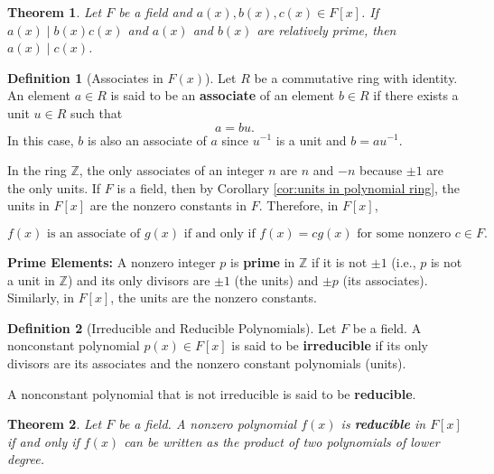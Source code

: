 \documentclass{article}
\newtheorem{theorem}{Theorem}[section]
\theoremstyle{definition}
\newtheorem{definition}{Definition}[section]
\theoremstyle{remark}
\begin{document}
\begin{theorem} \label{thm:relatively prime divisibility}
Let $F$ be a field and $a(x), b(x), c(x) \in F[x]$. If $a(x) \mid b(x)c(x)$ and $a(x)$ and $b(x)$ are relatively prime, then $a(x) \mid c(x)$.
\end{theorem}

\begin{definition}[Associates in $F(x)$]
Let $R$ be a commutative ring with identity. An element $a \in R$ is said to be an \textbf{associate} of an element $b \in R$ if there exists a unit $u \in R$ such that
\[
a = bu.
\]
In this case, $b$ is also an associate of $a$ since $u^{-1}$ is a unit and $b = au^{-1}$.

In the ring $\mathbb{Z}$, the only associates of an integer $n$ are $n$ and $-n$ because $\pm 1$ are the only units. If $F$ is a field, then by Corollary \ref{cor:units in polynomial ring}, the units in $F[x]$ are the nonzero constants in $F$. Therefore, in $F[x]$,

\[
f(x) \text{ is an associate of } g(x) \text{ if and only if } f(x) = c g(x) \text{ for some nonzero } c \in F.
\]

\textbf{Prime Elements:}  
A nonzero integer $p$ is \textbf{prime} in $\mathbb{Z}$ if it is not $\pm1$ (i.e., $p$ is not a unit in $\mathbb{Z}$) and its only divisors are $\pm1$ (the units) and $\pm p$ (its associates). Similarly, in $F[x]$, the units are the nonzero constants.

\end{definition}


\begin{definition}[Irreducible and Reducible Polynomials]
Let $F$ be a field. A nonconstant polynomial $p(x) \in F[x]$ is said to be \textbf{irreducible} if its only divisors are its associates and the nonzero constant polynomials (units). 

A nonconstant polynomial that is not irreducible is said to be \textbf{reducible}.
\end{definition}


\begin{theorem} \label{thm:reducibility criterion}
Let $F$ be a field. A nonzero polynomial $f(x)$ is \textbf{reducible} in $F[x]$ if and only if $f(x)$ can be written as the product of two polynomials of lower degree.
\end{theorem}
\end{document}

